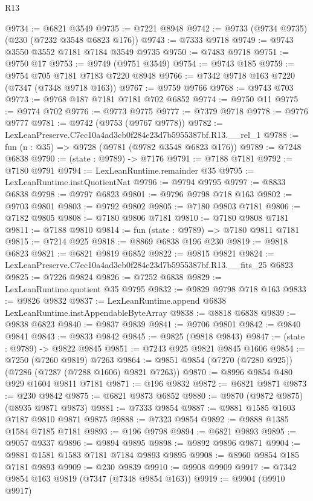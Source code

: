 \begin{lexlean}{R13}
\begin{coremodule}
@9734 := @6821 @3549
@9735 := @7221 @8948
@9742 := @9733 (@9734 @9735) (@230 (@7232 @3548 @6823 @176))
@9743 := @7333 @9718
@9749 := @9743 @3550 @3552 @7181 @7184 @3549 @9735
@9750 := @7483 @9718
@9751 := @9750 @17
@9753 := @9749 (@9751 @3549)
@9754 := @9743 @185
@9759 := @9754 @705 @7181 @7183 @7220 @8948
@9766 := @7342 @9718 @163 @7220 (@7347 (@7348 @9718 @163))
@9767 := @9759 @9766
@9768 := @9743 @703
@9773 := @9768 @187 @7181 @7181 @702 @6852
@9774 := @9750 @11
@9775 := @9774 @702
@9776 := @9773 @9775
@9777 := @7379 @9718
@9778 := @9776 @9777
@9781 := @9742 (@9753 (@9767 @9778))
@9782 := LexLeanPreserve.C7ec10a4ad3cb0f284e23d7b5955387bf.R13.__rel_1
@9788 := fun (n : @35) => @9728 (@9781 (@9782 @3548 @6823 @176))
@9789 := @7248 @6838
@9790 := (state : @9789) -> @7176
@9791 := @7188 @7181
@9792 := @7180 @9791
@9794 := LexLeanRuntime.remainder @35
@9795 := LexLeanRuntime.instQuotientNat
@9796 := @9794 @9795
@9797 := @8833 @6838
@9798 := @9797 @6823
@9801 := @9796 @9798 @718 @163
@9802 := @9703 @9801
@9803 := @9792 @9802
@9805 := @7180 @9803 @7181
@9806 := @7182 @9805
@9808 := @7180 @9806 @7181
@9810 := @7180 @9808 @7181
@9811 := @7188 @9810
@9814 := fun (state : @9789) => @7180 @9811 @7181
@9815 := @7214 @925
@9818 := @8869 @6838 @196 @230
@9819 := @9818 @6823
@9821 := @6821 @9819 @6852
@9822 := @9815 @9821
@9824 := LexLeanPreserve.C7ec10a4ad3cb0f284e23d7b5955387bf.R13.__fits_25 @6823
@9825 := @7226 @9824
@9826 := @7252 @6838
@9829 := LexLeanRuntime.quotient @35 @9795
@9832 := @9829 @9798 @718 @163
@9833 := @9826 @9832
@9837 := LexLeanRuntime.append @6838 LexLeanRuntime.instAppendableByteArray
@9838 := @8818 @6838
@9839 := @9838 @6823
@9840 := @9837 @9839
@9841 := @9706 @9801
@9842 := @9840 @9841
@9843 := @9833 @9842
@9845 := @9825 (@9818 @9843)
@9847 := (state : @9789) -> @9822 @9845
@9851 := @7243 @925 @9821 @9845 @1606
@9854 := @7250 (@7260 @9819) @7263
@9864 := @9851 @9854 (@7270 (@7280 @925)) (@7286 (@7287 (@7288 @1606) @9821 @7263))
@9870 := @8996 @9854 @480 @929 @1604 @9811 @7181
@9871 := @196 @9832
@9872 := @6821 @9871
@9873 := @230 @9842
@9875 := @6821 @9873 @6852
@9880 := @9870 (@9872 @9875) (@8935 @9871 @9873)
@9881 := @7333 @9854
@9887 := @9881 @1585 @1603 @7187 @9810 @9871 @9875
@9888 := @7323 @9854
@9892 := @9888 @1385 @1584 @7185 @7181
@9893 := @196 @9798
@9894 := @6821 @9893
@9895 := @9057 @9337
@9896 := @9894 @9895
@9898 := @9892 @9896 @9871
@9904 := @9881 @1581 @1583 @7181 @7184 @9893 @9895
@9908 := @8960 @9854 @185 @7181 @9893
@9909 := @230 @9839
@9910 := @9908 @9909
@9917 := @7342 @9854 @163 @9819 (@7347 (@7348 @9854 @163))
@9919 := @9904 (@9910 @9917)

\end{coremodule}
\end{lexlean}
